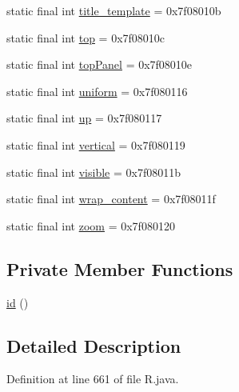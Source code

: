 \begin{DoxyCompactItemize}
\item 
static final int \mbox{\hyperlink{classcom_1_1synnapps_1_1carouselview_1_1_r_1_1id_a59f798cb59c6deea6dff49f4e2119aa2}{title\+\_\+template}} = 0x7f08010b
\item 
static final int \mbox{\hyperlink{classcom_1_1synnapps_1_1carouselview_1_1_r_1_1id_a071a2745a1228346e43b75c99fc77113}{top}} = 0x7f08010c
\item 
static final int \mbox{\hyperlink{classcom_1_1synnapps_1_1carouselview_1_1_r_1_1id_ae3d358d486eb21e6b3cf3cc1db3f81e3}{top\+Panel}} = 0x7f08010e
\item 
static final int \mbox{\hyperlink{classcom_1_1synnapps_1_1carouselview_1_1_r_1_1id_a7dccc5cb2b747f148ea0916ea306c2d1}{uniform}} = 0x7f080116
\item 
static final int \mbox{\hyperlink{classcom_1_1synnapps_1_1carouselview_1_1_r_1_1id_ac13ba2a5f114359bed948f12555dc844}{up}} = 0x7f080117
\item 
static final int \mbox{\hyperlink{classcom_1_1synnapps_1_1carouselview_1_1_r_1_1id_a8f35064ae585cbfe59fa891163eddd14}{vertical}} = 0x7f080119
\item 
static final int \mbox{\hyperlink{classcom_1_1synnapps_1_1carouselview_1_1_r_1_1id_ab5111df2be218c4a85af19878d245b83}{visible}} = 0x7f08011b
\item 
static final int \mbox{\hyperlink{classcom_1_1synnapps_1_1carouselview_1_1_r_1_1id_a0c2412694b6f7d40c79f7f4397fd60c3}{wrap\+\_\+content}} = 0x7f08011f
\item 
static final int \mbox{\hyperlink{classcom_1_1synnapps_1_1carouselview_1_1_r_1_1id_af872f48dda88ab7bc9941b95fce004ae}{zoom}} = 0x7f080120
\end{DoxyCompactItemize}
\subsection*{Private Member Functions}
\begin{DoxyCompactItemize}
\item 
\mbox{\hyperlink{classcom_1_1synnapps_1_1carouselview_1_1_r_1_1id_a0fa81dba49c5c05ce8fda5b413521860}{id}} ()
\end{DoxyCompactItemize}


\subsection{Detailed Description}


Definition at line 661 of file R.\+java.



